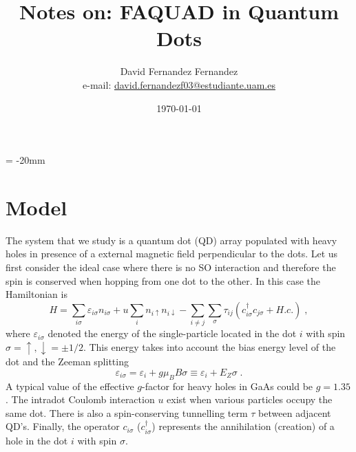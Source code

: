 \documentclass[a4paper,11pt]{article}
\begin{document}
   \droptitle = -20mm
   \title{Notes on: FAQUAD in Quantum Dots}

   \author{David Fernandez Fernandez \\ e-mail: \href{mailto:david.fernandezf03@estudiante.uam.es}{david.fernandezf03@estudiante.uam.es}}
   
   \date{\today}

   \maketitle
   
   \tableofcontents
    

\section{Model}

The system that we study is a quantum dot (QD) array populated with heavy holes in presence of a external magnetic field perpendicular to the dots. Let us first consider the ideal case where there is no SO interaction and therefore the spin is conserved when hopping from one dot to the other. In this case the Hamiltonian is
\begin{equation}
H=\sum_{i\sigma}\varepsilon_{i\sigma}n_{i\sigma}+u\sum_in_{i\uparrow}n_{i\downarrow}-\sum_{i\neq j}\sum_\sigma\tau_{ij}\left(c_{i\sigma}^\dagger c_{j\sigma}+H.c.\right)\; ,
\label{eq:Hubbard_model}
\end{equation}
where $\varepsilon_{i\sigma}$ denoted the energy of the single-particle located in the dot $i$ with spin $\sigma=\uparrow,\downarrow=\pm1/2$. This energy takes into account the bias energy level of the dot and the Zeeman splitting
\begin{equation}
\varepsilon_{i\sigma}=\varepsilon_i+g\mu_B B\sigma\equiv \varepsilon_i+E_Z\sigma\; .
\end{equation}
A typical value of the effective $g$-factor for heavy holes in GaAs could be $g=1.35$. The intradot Coulomb interaction $u$ exist when various particles occupy the same dot. There is also a spin-conserving tunnelling term $\tau$ between adjacent QD's. Finally, the operator $c_{i\sigma}$ ($c_{i\sigma}^{\dagger}$) represents the annihilation (creation) of a hole in the dot $i$ with spin $\sigma$.
\end{document}
